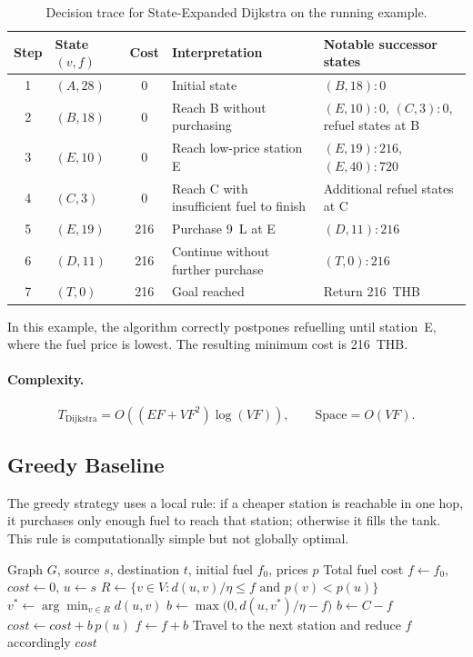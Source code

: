 \begin{table}[ht]
\centering
\caption{Decision trace for State-Expanded Dijkstra on the running example.}
\label{tab:dijkstra_trace}
\small
\begin{tabularx}{\textwidth}{c l c l X}
\toprule
Step & State $(v,f)$ & Cost & Interpretation & Notable successor states \\
\midrule
1 & $(A,28)$ & 0 & Initial state & $(B,18){:}0$ \\
2 & $(B,18)$ & 0 & Reach B without purchasing & $(E,10){:}0$, $(C,3){:}0$, refuel states at B \\
3 & $(E,10)$ & 0 & Reach low-price station E & $(E,19){:}216$, $(E,40){:}720$ \\
4 & $(C,3)$ & 0 & Reach C with insufficient fuel to finish & Additional refuel states at C \\
5 & $(E,19)$ & 216 & Purchase 9~L at E & $(D,11){:}216$ \\
6 & $(D,11)$ & 216 & Continue without further purchase & $(T,0){:}216$ \\
7 & $(T,0)$ & 216 & Goal reached & Return 216~THB \\
\bottomrule
\end{tabularx}
\end{table}

In this example, the algorithm correctly postpones refuelling until station~E, where the fuel price is lowest. The resulting minimum cost is 216~THB.

\paragraph{Complexity.}
\[
T_{\mathrm{Dijkstra}}=O\!\left((EF+VF^{2})\log(VF)\right),
\qquad
\text{Space}=O(VF).
\]

\subsection{Greedy Baseline}
\label{subsec:greedy}

The greedy strategy uses a local rule: if a cheaper station is reachable in one hop, it purchases only enough fuel to reach that station; otherwise it fills the tank. This rule is computationally simple but not globally optimal.

\begin{algorithm}[H]
\caption{Greedy Fuel-Aware Routing}
\label{alg:greedy}
\begin{algorithmic}[1]
\Require Graph $G$, source $s$, destination $t$, initial fuel $f_0$, prices $p$
\Ensure Total fuel cost
\State $f \gets f_0$, $\mathit{cost} \gets 0$, $u \gets s$
    \State $R \gets \{v\in V : d(u,v)/\eta \le f \text{ and } p(v)<p(u)\}$
        \State $v^{*} \gets \arg\min_{v\in R} d(u,v)$
        \State $b \gets \max\bigl(0, d(u,v^{*})/\eta - f\bigr)$
    \Else
        \State $b \gets C-f$
    \EndIf
    \State $\mathit{cost} \gets \mathit{cost} + b\,p(u)$
    \State $f \gets f+b$
    \State Travel to the next station and reduce $f$ accordingly
\EndWhile
\State \Return $\mathit{cost}$
\end{algorithmic}
\end{algorithm}

